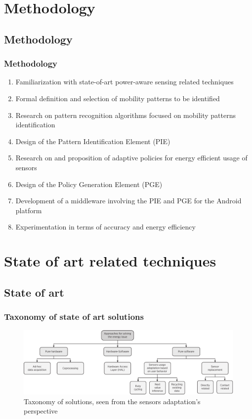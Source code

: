 \documentclass[compress,9pt,xcolor={dvipsnames,table}]{beamer}
\begin{document}
\section{Methodology}
\subsection{Methodology}
\begin{frame}\frametitle{Methodology}
\begin{enumerate}
  \item Familiarization with state-of-art power-aware sensing related techniques
  \item Formal definition and selection of mobility patterns to be identified
  \item Research on pattern recognition algorithms focused on mobility patterns identification
  \item Design of the Pattern Identification Element (PIE)
  \item Research on and proposition of adaptive policies for energy efficient usage of sensors
  \item Design of the Policy Generation Element (PGE)
  \item Development of a middleware involving the PIE and PGE for the Android platform
  \item Experimentation in terms of accuracy and energy efficiency
\end{enumerate}
\end{frame}


\section[State-of-art]{State of art related techniques}
\subsection{State of art}
\begin{frame}\frametitle{Taxonomy of state of art solutions}
\begin{figure}[tb]
  \centering
  \includegraphics[width=\textwidth]{../../../resources/images/vectors/approaches-taxonomy}
  \caption{Taxonomy of solutions, seen from the sensors adaptation's perspective}
  \label{fig:taxonomy}
\end{figure}
\end{frame}
\end{document}
